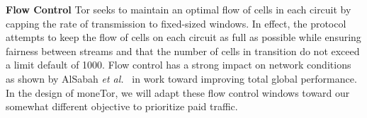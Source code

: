\noindent\textbf{Flow Control}
Tor seeks to maintain an optimal flow of cells in
each circuit by capping the rate of transmission to fixed-sized windows.
In effect, the protocol attempts to keep the flow of cells on each circuit as
full as possible while ensuring fairness between streams and that the number of
cells in transition do not exceed a limit default of 1000. Flow control has a
strong impact on network conditions as shown by AlSabah \textit{et
  al.}~\cite{pets2011-defenestrator} in work toward improving total global
performance. In the design of moneTor, we will adapt these flow control windows
toward our somewhat different objective to prioritize paid traffic.




%

